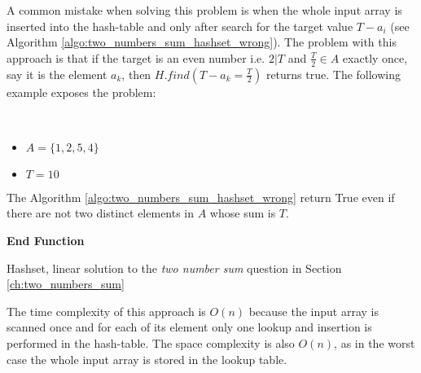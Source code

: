 

A common mistake when solving this problem is when the whole input array is inserted into the
hash-table and only after search for the target value $T-a_i$ (see Algorithm
\ref{algo:two_numbers_sum_hashset_wrong}). The problem with this approach is that if the target is
an even number i.e. $ 2 | T$ and $\frac{T}{2} \in A$ exactly once, say it is the element $a_k$, then
$H.find(T-a_k=\frac{T}{2})$ returns true. The following example exposes the problem:
\begin{example}
	\hfill \\ 
	\begin{itemize}
		\item[] $A=\{1,2,5,4\}$
	\item[] $T = 10$
\end{itemize}
The Algorithm \ref{algo:two_numbers_sum_hashset_wrong} return True even if there are not two
distinct elements in $A$ whose sum is $T$.
\end{example}



\begin{algorithm}
	 
	   
	
	 \textbf{End Function}
	\label{algo:two_numbers_sum_hashset_wrong}
	\caption{Hashset, linear solution to the \textit{two number sum} question in Section
	\ref{ch:two_numbers_sum} }
\end{algorithm}
The time complexity of this approach is $O(n)$ because the input array is scanned once and for each
of its element only one lookup and insertion is performed in the hash-table.  The space complexity
is also $O(n)$, as in the worst case the whole input array is stored in the lookup table.

